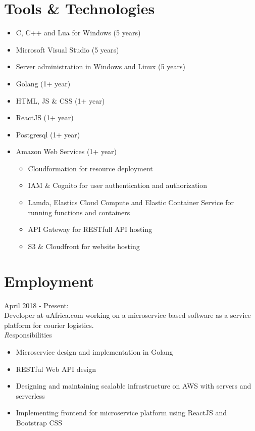 \documentclass[11pt,a4paper]{article}
\begin{document}
\section*{Tools \& Technologies}
\begin{itemize}
	\item C, C++ and Lua for Windows (5 years)
	\item Microsoft Visual Studio (5 years)
	\item Server administration in Windows and Linux (5 years)
	\item Golang (1+ year)
	\item HTML, JS \& CSS (1+ year)
	\item ReactJS (1+ year)
	\item Postgresql (1+ year)
	\item Amazon Web Services (1+ year)
	\begin{itemize}
		\item Cloudformation for resource deployment
		\item IAM \& Cognito for user authentication and authorization
		\item Lamda, Elastics Cloud Compute and Elastic Container Service for running functions and containers 
		\item API Gateway for RESTfull API hosting
		\item S3 \& Cloudfront for website hosting
	\end{itemize}
\end{itemize}

\section*{Employment}
{\noindent\large April 2018 - Present:}\\

Developer at uAfrica.com working on a microservice based software as a service platform for courier logistics.
\\

	{\emph Responsibilities}
	\begin{itemize}
	\item Microservice design and implementation in Golang
	\item RESTful Web API design
	\item Designing and maintaining scalable infrastructure on AWS with servers and serverless
	\item Implementing frontend for microservice platform using ReactJS and Bootstrap CSS
	\end{itemize}
\end{document}

